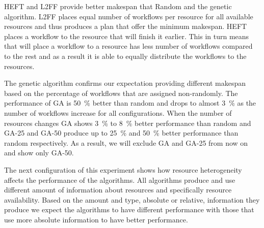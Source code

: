 HEFT and L2FF provide better makespan that Random and the genetic algorithm.
L2FF places equal number of workflows per resource for all available resources and thus produces a plan that offer the minimum makespan.
HEFT places a workflow to the resource that will finish it earlier.
This in turn means that will place a workflow to a resource has less number of workflows compared to the rest and as a result it is able to equally distribute the workflows to the resources.

The genetic algorithm confirms our expectation providing different makespan based on the percentage of workflows that are assigned non-randomly.
The performance of GA is 50~\% better than random and drops to almost 3~\% as the number of workflows increase for all configurations.
When the number of resources changes GA shows 3~\% to 8~\% better performance than random and GA-25 and GA-50 produce up to 25~\% and 50~\% better performance than random respectively.
As a result, we will exclude GA and GA-25 from now on and show only GA-50.

The next configuration of this experiment shows how resource heterogeneity affects the performance of the algorithms.
All algorithms produce and use different amount of information about resources and specifically resource availability.
Based on the amount and type, absolute or relative, information they produce we expect the algorithms to have different performance with those that use more absolute information to have better performance.


